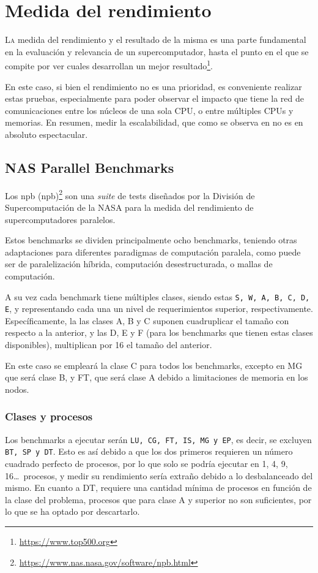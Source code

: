 \chapter{Medida del rendimiento}
\label{chap:medida_rendimiento}

\lettrine{L}{a} medida del rendimiento y el resultado de la misma es una parte fundamental en la evaluación y relevancia de un supercomputador, hasta el punto en el que se compite por ver cuales desarrollan un mejor resultado\footnote{\url{https://www.top500.org}}.

En este caso, si bien el rendimiento no es una prioridad, es conveniente realizar estas pruebas, especialmente para poder observar el impacto que tiene la red de comunicaciones entre los núcleos de una sola CPU, o entre múltiples CPUs y memorias. En resumen, medir la escalabilidad, que como se observa en  no es en absoluto espectacular.

\section{NAS Parallel Benchmarks}
Los \acrlong{npb} (\acrshort{npb})\footnote{\url{https://www.nas.nasa.gov/software/npb.html}} son una \textit{suite} de tests diseñados por la División de Supercomputación de la NASA para la medida del rendimiento de supercomputadores paralelos.

Estos benchmarks se dividen principalmente ocho benchmarks, teniendo otras adaptaciones para diferentes paradigmas de computación paralela, como puede ser de paralelización híbrida, computación desestructurada, o mallas de computación.

A su vez cada benchmark tiene múltiples clases, siendo estas \texttt{S, W, A, B, C, D, E}, y representando cada una un nivel de requerimientos superior, respectivamente. Específicamente, la las clases A, B y C suponen cuadruplicar el tamaño con respecto a la anterior, y las D, E y F (para los benchmarks que tienen estas clases disponibles), multiplican por 16 el tamaño del anterior.

En este caso se empleará la clase C para todos los benchmarks, excepto en MG que será clase B, y FT, que será clase A debido a limitaciones de memoria en los nodos.

\subsection{Clases y procesos}
\label{ssec:clases_y_procesos}
Los benchmarks a ejecutar serán \texttt{LU, CG, FT, IS, MG y EP}, es decir, se excluyen \texttt{BT, SP y DT}. Esto es así debido a que los dos primeros requieren un número cuadrado perfecto de procesos, por lo que solo se podría ejecutar en 1, 4, 9, 16\dots\ procesos, y medir su rendimiento sería extraño debido a lo desbalanceado del mismo. En cuanto a DT, requiere una cantidad mínima de procesos en función de la clase del problema, procesos que para clase A y superior no son suficientes, por lo que se ha optado por descartarlo.


